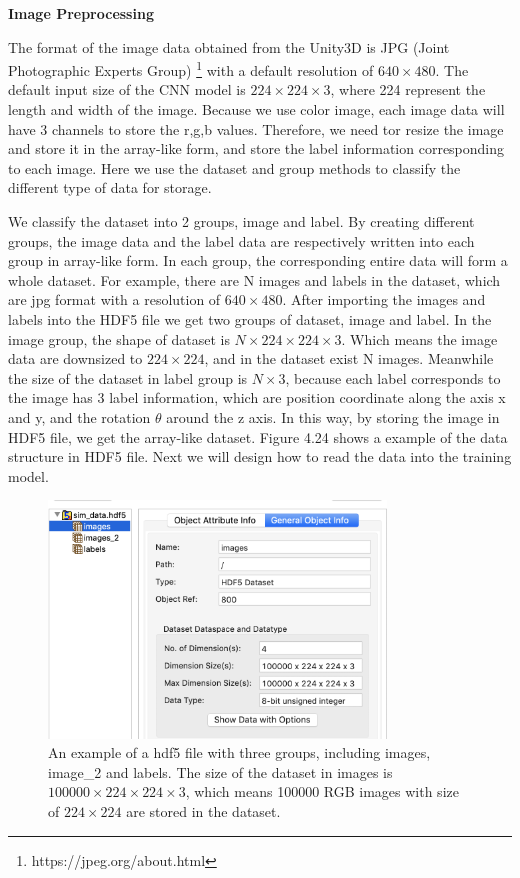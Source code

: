 \textbf{Image Preprocessing}

The format of the image data obtained from the Unity3D is JPG (Joint Photographic Experts Group) \footnote{https://jpeg.org/about.html} with a default resolution of $640\times480$. The default input size of the CNN model is $224\times224\times3$, where 224 represent the length and width of the image. Because we use color image, each image data will have 3 channels to store the r,g,b values. Therefore, we need tor resize the image and store it in the array-like form, and store the label information corresponding to each image. Here we use the dataset and group methods to classify the different type of data for storage.

We classify the dataset into 2 groups, image and label. By creating different groups, the image data and the label data are respectively written into each group in array-like form. In each group, the corresponding entire data will form a whole dataset. For example, there are N images and labels in the dataset, which are jpg format with a resolution of $640\times480$. After importing the images and labels into the HDF5 file we get two groups of dataset, image and label. In the image group, the shape of dataset is $N\times224\times224\times3$. Which means the image data are downsized to $224\times224$, and in the dataset exist N images. Meanwhile the size of the dataset in label group is $N\times3$, because each label corresponds to the image has 3 label information, which are position coordinate along the axis x and y, and the rotation $\theta$ around the z axis. In this way, by storing the image in HDF5 file, we get the array-like dataset. Figure 4.24 shows a example of the data structure in HDF5 file. Next we will design how to read the data into the training model.

\begin{figure}[h]
	\includegraphics[width=0.8\textwidth]{Figures/Section4_HDF.png} 
	\centering
	\caption{An example of a hdf5 file with  three groups, including images, image\_2 and labels. The size of the dataset in images is $ 100000 \times224 \times 224 \times3 $, which means 100000 RGB images with size of $224\times 224$ are stored in the dataset.}
	\label{fig:hdf}
\end{figure}


